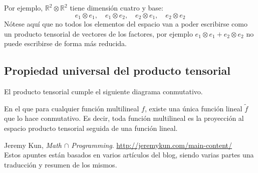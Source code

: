 \documentclass[paper=a4, fontsize=11pt, spanish]{scrartcl}
\numberwithin{equation}{section} %
\numberwithin{figure}{section} %
\numberwithin{table}{section} %
\begin{document}
    Por ejemplo, $\mathbb{R}^2\otimes\mathbb{R}^2$ tiene dimensión cuatro y base:
    $$ e_1\otimes e_1,\quad e_1\otimes e_2,\quad  e_2 \otimes e_1,\quad  e_2 \otimes e_2 $$
    Nótese aquí que no todos los elementos del espacio van a poder escribirse como un producto tensorial
    de vectores de los factores, por ejemplo $e_1 \otimes e_1 + e_2 \otimes e_2$ no puede escribirse de forma
    más reducida. %
    
  \subsection{Propiedad universal del producto tensorial}
    El producto tensorial cumple el siguiente diagrama conmutativo.
    \begin{center}
      \end{center}
    En el que para cualquier función multilineal $f$, existe una única función
    lineal $\tilde f$ que lo hace conmutativo. Es decir, toda función multilineal es la proyección 
    al espacio producto tensorial seguida de una función lineal.
    
    
  \vfill
  \begin{thebibliography}{9}

    Jeremy Kun,
    \emph{Math $\cap$ Programming}. \quad
    \url{http://jeremykun.com/main-content/} \\
    Estos apuntes están basados en varios artículos del blog, siendo 
    varias partes una traducción y resumen de los mismos.
  \end{thebibliography}
\end{document}
